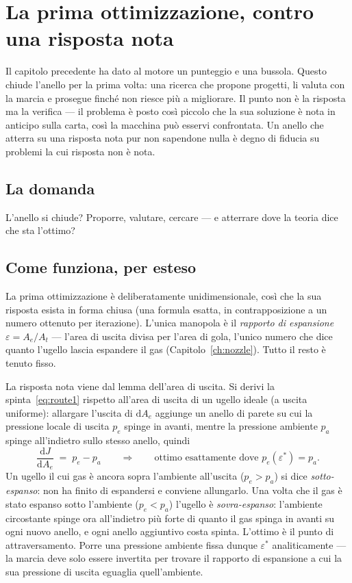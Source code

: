 \chapter{La prima ottimizzazione, contro una risposta nota}
\label{ch:firstopt}

Il capitolo precedente ha dato al motore un punteggio e una bussola.
Questo chiude l'anello per la prima volta: una ricerca che propone
progetti, li valuta con la marcia e prosegue finché non riesce più a
migliorare. Il punto non è la risposta ma la verifica --- il
problema è posto così piccolo che la sua soluzione è nota in anticipo
sulla carta, così la macchina può esservi confrontata. Un anello che
atterra su una risposta nota pur non sapendone nulla è degno di
fiducia su problemi la cui risposta non è nota.

\section{La domanda}

L'anello si chiude? Proporre, valutare, cercare --- e atterrare dove
la teoria dice che sta l'ottimo?

\section{Come funziona, per esteso}

La prima ottimizzazione è deliberatamente unidimensionale, così che
la sua risposta esista in forma chiusa (una formula esatta, in
contrapposizione a un numero ottenuto per iterazione). L'unica
manopola è il \emph{rapporto di espansione} $\varepsilon = A_e/A_t$
--- l'area di uscita divisa per l'area di gola, l'unico numero che
dice quanto l'ugello lascia espandere il gas
(Capitolo~\ref{ch:nozzle}). Tutto il resto è tenuto fisso.

La risposta nota viene dal lemma dell'area di uscita. Si derivi la
spinta~\eqref{eq:route1} rispetto all'area di uscita di un ugello
ideale (a uscita uniforme): allargare l'uscita di $\mathrm{d}A_e$
aggiunge un anello di parete su cui la pressione locale di uscita
$p_e$ spinge in avanti, mentre la pressione ambiente $p_a$ spinge
all'indietro sullo stesso anello, quindi
\begin{equation}
\frac{\mathrm{d}J}{\mathrm{d}A_e} \;=\; p_e - p_a
\qquad\Longrightarrow\qquad
\text{ottimo esattamente dove } p_e(\varepsilon^{*}) = p_a .
\label{eq:arealemma}
\end{equation}
Un ugello il cui gas è ancora sopra l'ambiente all'uscita
($p_e > p_a$) si dice \emph{sotto-espanso}: non ha finito di
espandersi e conviene allungarlo. Una volta che il gas è stato
espanso sotto l'ambiente ($p_e < p_a$) l'ugello è
\emph{sovra-espanso}: l'ambiente circostante spinge ora all'indietro
più forte di quanto il gas spinga in avanti su ogni nuovo anello, e
ogni anello aggiuntivo costa spinta. L'ottimo è il punto di
attraversamento. Porre una pressione ambiente fissa dunque
$\varepsilon^{*}$ analiticamente --- la marcia deve solo essere
invertita per trovare il rapporto di espansione a cui la sua
pressione di uscita eguaglia quell'ambiente.

